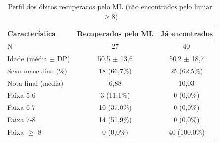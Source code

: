 \begin{table}[htbp]
\centering
\caption{Perfil dos óbitos recuperados pelo ML (não encontrados pelo limiar $\geq 8$)}
\label{tab:perfil-recuperados}
\begin{tabular}{lcc}
\toprule
Característica & Recuperados pelo ML & Já encontrados \\
\midrule
N & 27 & 40 \\
Idade (média $\pm$ DP) & 50,5 $\pm$ 13,6 & 50,2 $\pm$ 18,7 \\
Sexo masculino (\%) & 18 (66,7\%) & 25 (62,5\%) \\
Nota final (média) & 6,88 & 10,03 \\
\quad Faixa 5-6 & 3 (11,1\%) & 0 (0,0\%) \\
\quad Faixa 6-7 & 10 (37,0\%) & 0 (0,0\%) \\
\quad Faixa 7-8 & 14 (51,9\%) & 0 (0,0\%) \\
\quad Faixa $\geq$ 8 & 0 (0,0\%) & 40 (100,0\%) \\
\bottomrule
\end{tabular}
\end{table}
